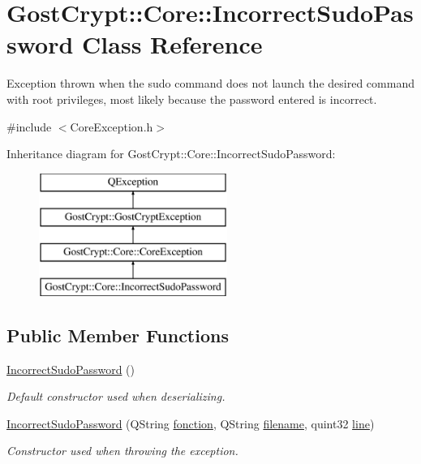 \hypertarget{class_gost_crypt_1_1_core_1_1_incorrect_sudo_password}{}\section{Gost\+Crypt\+:\+:Core\+:\+:Incorrect\+Sudo\+Password Class Reference}
\label{class_gost_crypt_1_1_core_1_1_incorrect_sudo_password}


Exception thrown when the sudo command does not launch the desired command with root privileges, most likely because the password entered is incorrect.  




{\ttfamily \#include $<$Core\+Exception.\+h$>$}

Inheritance diagram for Gost\+Crypt\+:\+:Core\+:\+:Incorrect\+Sudo\+Password\+:\begin{figure}[H]
\begin{center}
\leavevmode
\includegraphics[height=4.000000cm]{class_gost_crypt_1_1_core_1_1_incorrect_sudo_password}
\end{center}
\end{figure}
\subsection*{Public Member Functions}
\begin{DoxyCompactItemize}
\item 
\hyperlink{class_gost_crypt_1_1_core_1_1_incorrect_sudo_password_a44530320b2d5e930679f72c94bc5d97d}{Incorrect\+Sudo\+Password} ()
\begin{DoxyCompactList}\small\item\em Default constructor used when deserializing. \end{DoxyCompactList}\item 
\hyperlink{class_gost_crypt_1_1_core_1_1_incorrect_sudo_password_ac572051100a71b24288c7080b9401af0}{Incorrect\+Sudo\+Password} (Q\+String \hyperlink{class_gost_crypt_1_1_gost_crypt_exception_a29b8c93d5efbb1ff369107385725a939}{fonction}, Q\+String \hyperlink{class_gost_crypt_1_1_gost_crypt_exception_a749a12375f4ba9d502623b99d8252f38}{filename}, quint32 \hyperlink{class_gost_crypt_1_1_gost_crypt_exception_abf506d911f12a4e969eea500f90bd32c}{line})
\begin{DoxyCompactList}\small\item\em Constructor used when throwing the exception. \end{DoxyCompactList}\end{DoxyCompactItemize}
